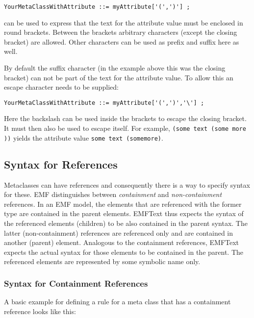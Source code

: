 \begin{lstlisting}
YourMetaClassWithAttribute ::= myAttribute['(',')'] ;
\end{lstlisting}

can be used to express that the text for the attribute value must be enclosed in 
round brackets. Between the brackets arbitrary characters (except the closing 
bracket) are allowed. Other characters can be used as prefix and suffix here as 
well.

By default the suffix character (in the example above this was the closing 
bracket) can not be part of the text for the attribute value. To allow this 
an escape character needs to be supplied:

\begin{lstlisting}
YourMetaClassWithAttribute ::= myAttribute['(',')','\'] ;
\end{lstlisting}

Here the backslash can be used inside the brackets to escape the closing 
bracket. It must then also be used to escape itself. For example,
\texttt{(some text (some more\\))} yields the attribute value \texttt{some text
(somemore)}.

\subsection{Syntax for References}

Metaclasses can have references and consequently there is a way to specify 
syntax for these. EMF distinguishes between \emph{containment} and
\emph{non-containment} references. In an EMF model, the elements that are
referenced with the former type are contained in the parent elements. EMFText
thus expects the syntax of the referenced elements (children) to be also 
contained in the parent syntax. The latter (non-containment) references are
referenced only and are contained in another (parent) element. Analogous to 
the containment references, EMFText expects the actual syntax for those elements
to be contained in the parent. The referenced elements are represented by 
some symbolic name only.

\subsubsection{Syntax for Containment References}

A basic example for defining a rule for a meta class that has a containment 
reference looks like this:


